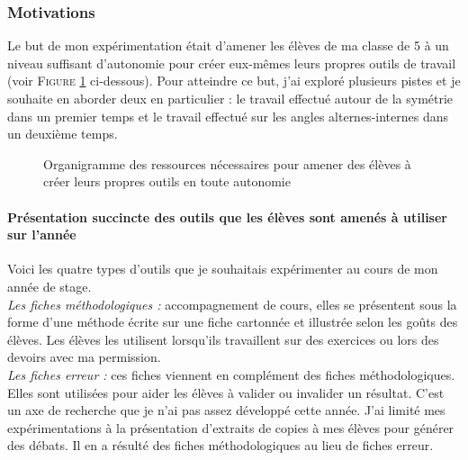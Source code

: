 \subsubsection{Motivations}

Le but de mon expérimentation était d'amener les élèves de ma classe de 5 à un niveau suffisant d'autonomie pour créer eux-mêmes leurs propres outils de travail (voir \textsc{Figure \ref{org:xav}} ci-dessous). Pour atteindre ce but, j'ai exploré plusieurs pistes et je souhaite en aborder deux en particulier : le travail effectué autour de la symétrie dans un premier temps et le travail effectué sur les angles alternes-internes dans un deuxième temps.

\begin{figure}[h!]
    \centering
    
    \caption{Organigramme des ressources nécessaires pour amener des élèves à créer leurs propres outils en toute autonomie}
    \label{org:xav}
\end{figure}

\paragraph{Présentation succincte des outils que les élèves sont amenés à utiliser sur l'année}

Voici les quatre types d'outils que je souhaitais expérimenter au cours de mon année de stage.\\

\textit{Les fiches méthodologiques :} accompagnement de cours, elles se présentent sous la forme d'une méthode écrite sur une fiche cartonnée et illustrée selon les goûts des élèves. Les élèves les utilisent lorsqu'ils travaillent sur des exercices ou lors des devoirs avec ma permission.\\
	
\textit{Les fiches erreur :} ces fiches viennent en complément des fiches méthodologiques. Elles sont utilisées pour aider les élèves à valider ou invalider un résultat. C'est un axe de recherche que je n'ai pas assez développé cette année. J'ai limité mes expérimentations à la présentation d'extraits de copies à mes élèves pour générer des débats. Il en a résulté des fiches méthodologiques au lieu de fiches erreur.\\
	
